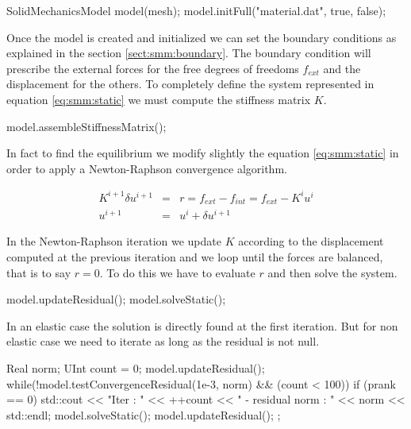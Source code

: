 \documentclass[a4paper,11pt]{book}
\begin{document}
\begin{cpp}
  SolidMechanicsModel model(mesh);
  model.initFull("material.dat", true, false);
\end{cpp}

Once the model is created and  initialized we can set the boundary conditions as
explained in  the section  \ref{sect:smm:boundary}. The boundary  condition will
prescribe the external forces for the free degrees of freedoms $f_{ext}$ and the
displacement for  the others.   To completely define  the system  represented in
equation   \ref{eq:smm:static}   we    must   compute   the   stiffness   matrix
$K$. 

\begin{cpp}
  model.assembleStiffnessMatrix();
\end{cpp}

In   fact  to   find   the   equilibrium  we   modify   slightly  the   equation
\ref{eq:smm:static} in order to apply a Newton-Raphson convergence algorithm.

\begin{eqnarray}\label{eq:smm:static-newton-raphson}
  K^{i+1} \delta u^{i+1} &=& r = f_{ext} - f_{int} = f_{ext} - K^{i} u^{i}\\
  u^{i+1} &=& u^{i} + \delta u^{i+1}
\end{eqnarray}

In  the Newton-Raphson  iteration we  update $K$  according to  the displacement
computed at  the previous iteration and  we loop until the  forces are balanced,
that is to  say $r = 0$. To do  this we have to evaluate $r$  and then solve the
system.

\begin{cpp}
  model.updateResidual();
  model.solveStatic();
\end{cpp}

In an  elastic case the solution is  directly found at the  first iteration. But
for non elastic case we need to iterate as long as the residual is not null.
\begin{cpp}
  Real norm;
  UInt count = 0;
  model.updateResidual();
  while(!model.testConvergenceResidual(1e-3, norm) && (count < 100)) {
    if (prank == 0)
      std::cout << "Iter : " << ++count
                << " - residual norm : "
                << norm << std::endl;
    model.solveStatic();
    model.updateResidual();
  };
\end{cpp}
\end{document}
